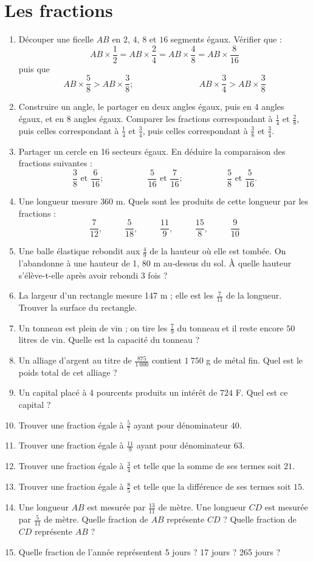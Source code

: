 
\chapter{Les fractions}
\begin{enumerate}
\item Découper une ficelle $AB$ en $2$, $4$, $8$ et $16$ segments égaux. Vérifier que : 
\[ AB \times \frac12 = AB \times \frac24 = AB \times \frac48 = AB \times \frac8{16}\]
puis que \[AB\times \frac58 > AB \times \frac38; \phantom{meowmeowmeow} AB \times \frac34 > AB \times
\frac38\]
\item Construire un angle, le partager en deux angles égaux, puis en 4 angles égaux, et en 8 angles égaux. Comparer les fractions correspondant à $\frac14$ et $\frac28$, puis celles correspondant à $\frac14$ et $\frac34$, puis celles correspondant à $\frac38$ et $\frac34$. 
\item Partager un cercle en 16 secteurs égaux. En déduire la comparaison des fractions suivantes : 
\[ \frac38\text{   et  } \frac6{16};\phantom{meowmeow}  \frac5{16}\text{   et  } \frac7{16};\phantom{meowmeow} 
 \frac58\text{   et  } \frac5{16}.\]
 \item Une longueur mesure  $360$ m. Quels sont les 
 produits de cette longueur par les fractions : 
 \[ \frac7{12}, \phantom{meow}\frac5{18},\phantom{meow}
 \frac{11}9,\phantom{meow}\frac{15}8, \phantom{meow}
 \frac9{10}\]
 \item Une balle élastique rebondit aux $\frac49$ de la hauteur où elle est tombée. On l'abandonne à une 
 hauteur de 1, 80 m au-dessus du sol. À quelle hauteur
 s'élève-t-elle après avoir rebondi 3 fois ? 
 \item La largeur d'un rectangle mesure 147 m ; elle est les $\frac7{11}$ de la longueur. Trouver la surface du rectangle. 
 \item Un tonneau est plein de vin ; on tire les $\frac79$ du tonneau et il reste encore $50$ litres de 
 vin. Quelle est la capacité du tonneau ? 
 \item Un alliage d'argent au titre de $\frac{875}{1~000}$ contient $1~750$ g de métal fin. Quel est le poids total de cet alliage ? 
 \item Un capital placé à $4$ pourcents produits un 
 intérêt de $724$ F. Quel est ce capital ? 
 \item Trouver une fraction égale à $\frac57$ ayant pour dénominateur $40$. 
 \item Trouver une fraction égale à $\frac{11}9$ 
 ayant pour dénominateur $63$. 
 \item Trouver une fraction égale à $\frac34$ 
 et telle que la somme de ses termes soit $21$.
 \item Trouver une fraction égale à $\frac85$ 
 et telle que la différence de ses termes soit $15$. 
 \item Une longueur $AB$ est mesurée par $\frac{13}{11}$ de mètre. Une longueur $CD$ est mesurée par $\frac5{11}$ de mètre. Quelle fraction de $AB$ représente $CD$ ? Quelle fraction de $CD$ représente 
$AB$ ? 
\item Quelle fraction de l'année représentent 5 jours ? 17 jours ? 265 jours ? 


\end{enumerate}
